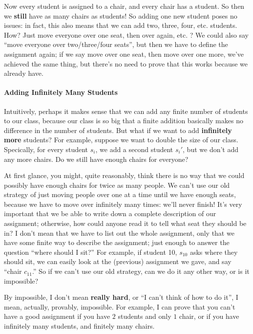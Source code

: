 Now every student is assigned to a chair, and every chair has a student. 
So then we \textbf{still} have as many chairs as students!
So adding one new student poses no issues: in fact, this also means that we can add two, three, four, etc. students.
How?
Just move everyone over one seat, then over again, etc.
?
We could also say ``move everyone over two/three/four seats'', but then we have to define the assignment again; if we say move over one seat, then move over one more, we've achieved the same thing, but there's no need to prove that this works because we already have.

\paragraph{Adding Infinitely Many Students}
Intuitively, perhaps it makes sense that we can add any finite number of students to our class, because our class is so big that a finite addition basically makes no difference in the number of students.
But what if we want to add \textbf{infinitely more} students? For example, suppose we want to double the size of our class.
Specically, for every student $s_i$, we add a second student $s_{i}'$, but we don't add any more chairs.
Do we still have enough chairs for everyone?

At first glance, you might, quite reasonably, think there is no way that we could possibly have enough chairs for twice as many people.
We can't use our old strategy of just moving people over one at a time until we have enough seats, because we have to move over infinitely many times: we'll never finish!
It's very important that we be able to write down a complete description of our assignment; otherwise, how could anyone read it to tell what seat they should be in?
I don't mean that we have to list out the whole assignment, only that we have some finite way to describe the assignment; just enough to answer the question ``where should I sit?''
For example, if student 10, $s_{10}$ asks where they should sit, we can easily look at the (previous) assignment we gave, and say ``chair $c_{11}$.''
So if we can't use our old strategy, can we do it any other way, or is it impossible?

By impossible, I don't mean \textbf{really hard}, or ``I can't think of how to do it'', I mean, actually, provably, impossible.
For example, I can prove that you can't have a good assignment if you have $2$ students and only $1$ chair, or if you have infinitely many students, and finitely many chairs. 

